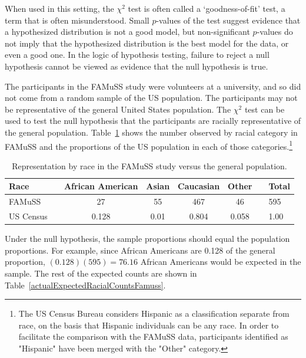 When used in this setting, the $\chi^2$ test is often called a `goodness-of-fit' test, a term that is often misunderstood.  Small $p$-values of the test suggest evidence that a hypothesized distribution is not a good model, but non-significant $p$-values do not imply that the hypothesized distribution is the best model for the data, or even a good one. In the logic of hypothesis testing, failure to reject a null hypothesis cannot be viewed as evidence that the null hypothesis is true.

\begin{example} {The participants in the FAMuSS study were volunteers at a university, and so did not come from a random sample of the US population.  The participants may not be representative of the general United States population. The $\chi^2$ test can be used to test the null hypothesis that the participants are racially representative of the general population.  Table~\ref{famussRacialProportions} shows the number observed by racial category in FAMuSS and the proportions of the US population in each of those categories.\footnote{The US Census Bureau considers Hispanic as a classification separate from race, on the basis that Hispanic individuals can be any race. In order to facilitate the comparison with the FAMuSS data, participants identified as "Hispanic" have been merged with the "Other" category.}

\begin{table}[h]
	\centering
	\begin{tabular}{ll ccc c ll}
		\hline
		Race	 & \hspace{2mm} & African American & Asian & Caucasian & Other & \hspace{2mm} & Total \\
		\hline
		FAMuSS &	& 27 & 55 & 467 & 46 & & 595 \\
		US Census	 & 		& 0.128 & 0.01 & 0.804 & 0.058 & & 1.00 \\
		\hline
	\end{tabular}
	\caption{Representation by race in the FAMuSS study versus the general population.}
    \label{famussRacialProportions}
\end{table}
}

Under the null hypothesis, the sample proportions should equal the population proportions. For example, since African Americans are 0.128 of the general proportion, $(0.128)(595) = 76.16$ African Americans would be expected in the sample.  The rest of the expected counts are shown in Table~\ref{actualExpectedRacialCountsFamuss}.


\end{example}
